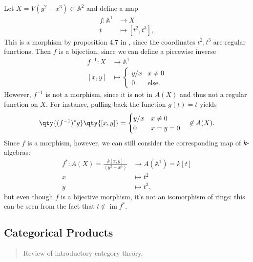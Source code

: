 \begin{warnings}

Let \(X = V(y^2 - x^3) \subset {\mathbb{A}}^2\) and define a map
\begin{align*}  
f: {\mathbb{A}}^1 &\to X \\
t &\mapsto {\left[ {t^2, t^3} \right]}
,\end{align*}
This is a morphism by proposition 4.7 in \autocite{AndreasGathmann515},
since the coordinates \(t^2, t^3\) are regular functions. Then \(f\) is
a bijection, since we can define a piecewise inverse
\begin{align*}  
f^{-1}: X &\to {\mathbb{A}}^1 \\
{\left[ {x, y} \right]} &\mapsto 
\begin{cases}
y/x & x\neq 0 \\
0 & \text{else}.
\end{cases}
\end{align*}
However, \(f^{-1}\) is not a morphism, since it is not in \(A(X)\) and
thus not a regular function on \(X\). For instance, pulling back the
function \(g(t) = t\) yields
\begin{align*}  
\qty{ (f^{-1})^* g} \qty{ {\left[ {x, y} \right]} } = 
\begin{cases}
y/x & x\neq 0\\
0 & x=y=0
\end{cases}
\quad 
\not \in A(X)
.\end{align*}
Since \(f\) is a morphism, however, we can still consider the
corresponding map of \(k{\hbox{-}}\)algebras:
\begin{align*}  
f^*: A(X) = \frac{k[x, y]}{\left\langle{y^2 - x^3}\right\rangle} &\to A({\mathbb{A}}^1) = k[t] \\
x & \mapsto t^2 \\
y & \mapsto t^3
,\end{align*}
but even though \(f\) is a bijective morphism, it's not an isomorphism
of rings: this can be seen from the fact that
\(t\not \in \operatorname{im}f^*\).

\end{warnings}

\hypertarget{categorical-products}{%
\subsection{Categorical Products}\label{categorical-products}}

\begin{quote}
Review of introductory category theory.
\end{quote}

